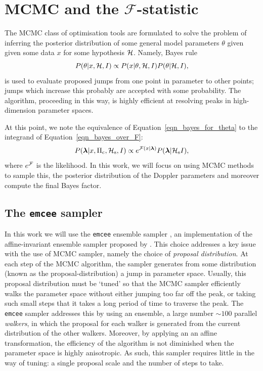 \documentclass[aps, prd, twocolumn, superscriptaddress, floatfix, showpacs, nofootinbib, longbibliography]{revtex4-1}
\begin{document}
\section{MCMC and the $\mathcal{F}$-statistic}
\label{sec_MCMC_and_the_F_statistic}

The MCMC class of optimisation tools are formulated to solve the problem of
inferring the posterior distribution of some general model parameters $\theta$
given given some data $x$ for some hypothesis $\mathcal{H}$. Namely, Bayes rule
\begin{equation}
P(\theta| x, \mathcal{H}, I) \propto P(x| \theta, \mathcal{H}, I)P(\theta| \mathcal{H}, I),
\label{eqn_bayes_for_theta}
\end{equation}
is used to evaluate proposed jumps from one point in parameter to other points;
jumps which increase this probably are accepted with some probability. The
algorithm, proceeding in this way, is highly efficient at resolving peaks in
high-dimension parameter spaces.

At this point, we note the equivalence of Equation~\eqref{eqn_bayes_for_theta}
to the integrand of Equation~\eqref{eqn_bayes_over_F}:
\begin{equation}
P(\boldsymbol{\mathbf{\lambda}} | x, \Pi_{\rm c}, \mathcal{H}_{\rm s}, I)
\propto e^{{\mathcal{F}}(x| \boldsymbol{\mathbf{\lambda}})} P(\boldsymbol{\mathbf{\lambda}}| \mathcal{H}_{\rm s} I),
\label{eqn_lambda_posterior}
\end{equation}
where $e^{{\mathcal{F}}}$ is the likelihood.
In this work, we will focus on using MCMC methods to sample this, the
posterior distribution of the Doppler parameters and moreover compute the
final Bayes factor.

\subsection{The \texttt{emcee} sampler}

In this work we will use the \texttt{emcee} ensemble sampler
\citep{foreman-mackay2013}, an implementation of the affine-invariant ensemble
sampler proposed by \citet{goodman2010}. This choice addresses a key issue with
the use of MCMC sampler, namely the choice of \emph{proposal distribution}. At
each step of the MCMC algorithm, the sampler generates from some distribution
(known as the proposal-distribution) a jump in parameter space. Usually, this
proposal distribution must be `tuned' so that the MCMC sampler efficiently
walks the parameter space without either jumping too far off the peak, or
taking such small steps that it takes a long period of time to traverse the
peak. The \texttt{emcee} sampler addresses this by using an ensemble, a large
number ${\sim}100$ parallel \emph{walkers}, in which the proposal for each
walker is generated from the current distribution of the other walkers.
Moreover, by applying an an affine transformation, the efficiency of the
algorithm is not diminished when the parameter space is highly anisotropic. As
such, this sampler requires little in the way of tuning: a single proposal
scale and the number of steps to take.
\end{document}
